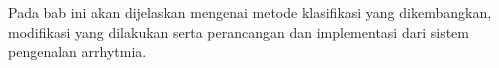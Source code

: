 \chapter{\babEmpat}
Pada bab ini akan dijelaskan mengenai metode klasifikasi yang dikembangkan,
modifikasi yang dilakukan serta perancangan dan implementasi dari sistem
pengenalan arrhytmia. 

\section{}
